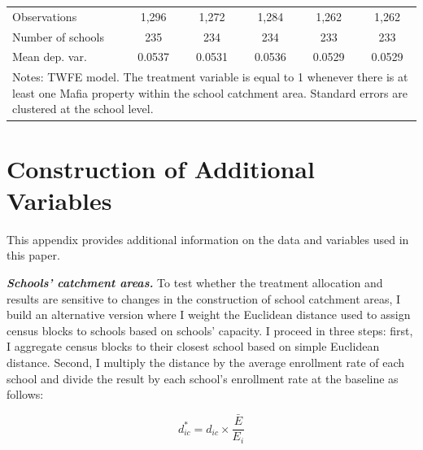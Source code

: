 \documentclass[12pt]{article}
\theoremstyle{plain}
\theoremstyle{plain}
\theoremstyle{plain}
\theoremstyle{definition}
\theoremstyle{plain}
\theoremstyle{definition}
\theoremstyle{plain}
\theoremstyle{remark}
\theoremstyle{definition}
\theoremstyle{definition}
\theoremstyle{plain}
\begin{document}
\begin{table}[H]
{\begin{tabular}{p{10.555em}lllll}
    \multicolumn{1}{l}{Observations} & \multicolumn{1}{c}{1,296} & \multicolumn{1}{c}{1,272} & \multicolumn{1}{c}{1,284} & \multicolumn{1}{c}{1,262} & \multicolumn{1}{c}{1,262} \\
    \multicolumn{1}{l}{Number of schools} & \multicolumn{1}{c}{235} & \multicolumn{1}{c}{234} & \multicolumn{1}{c}{234} & \multicolumn{1}{c}{233} & \multicolumn{1}{c}{233} \\
    \multicolumn{1}{l}{Mean dep. var.} & \multicolumn{1}{c}{0.0537} & \multicolumn{1}{c}{0.0531} & \multicolumn{1}{c}{0.0536} & \multicolumn{1}{c}{0.0529} & \multicolumn{1}{c}{0.0529} \\
    \midrule
    \multicolumn{6}{p{35em}}{Notes: TWFE model. The treatment variable is equal to 1 whenever there is at least one Mafia property within the school catchment area. Standard errors are clustered at the school level.} \\
    \end{tabular}%
    }
\end{table}

\newpage
\renewcommand{\thefigure}{D.\arabic{figure}}
\renewcommand{\thetable}{D.\arabic{table}}
\setcounter{figure}{0}
\setcounter{table}{0}
\FloatBarrier
\section{Construction of Additional Variables}
\label{sec:jmp_app_D}
\vspace{-0.3cm}
This appendix provides additional information on the data and variables used in this paper. \par
\vspace{0.2cm}


    \medskip
\textbf{\emph{Schools' catchment areas.}} To test whether the treatment allocation and results are sensitive to changes in the construction of school catchment areas, I build an alternative version where I weight the Euclidean distance used to assign census blocks to schools based on schools' capacity. I proceed in three steps: first, I aggregate census blocks to their closest school based on simple Euclidean distance. Second, I multiply the distance by the average enrollment rate of each school and divide the result by each school's enrollment rate at the baseline as follows:

\begin{equation*}
d_{ic}^* = d_{ic} \times \frac{\bar{E}}{E_i}
\end{equation*}
\end{document}
